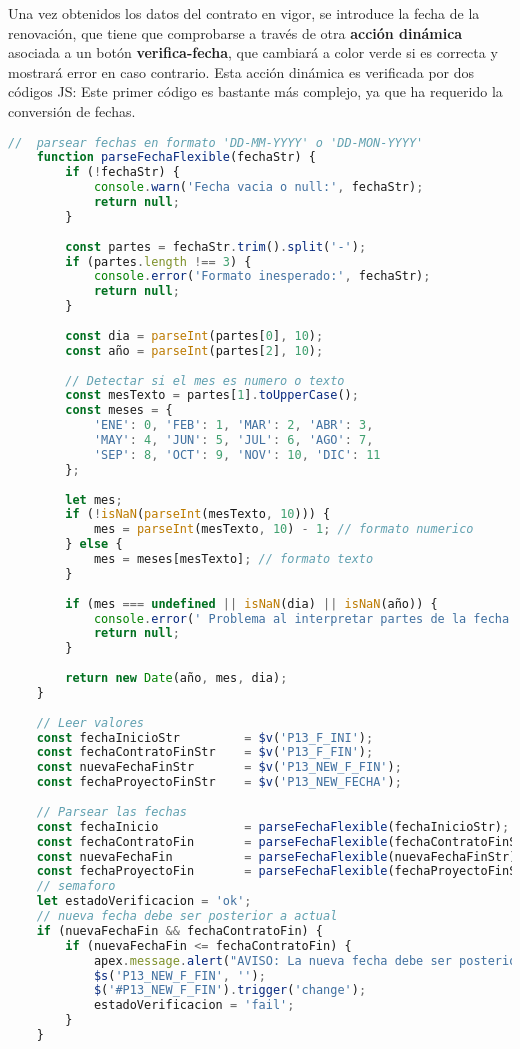 Una vez obtenidos los datos del contrato en vigor, se introduce la fecha de la renovación, que tiene que comprobarse a través de otra \textbf{acción dinámica} asociada a un botón \textbf{verifica-fecha}, que cambiará a color verde si es correcta y mostrará error en caso contrario. Esta acción dinámica es verificada por dos códigos \acrshort{JS}:
Este primer código es bastante más complejo, ya que ha requerido la conversión de fechas.
\begin{lstlisting}[language=JavaScript, caption={Verifica la fecha de renovación se posterior a la actual y anterior a fin proyecto}]
	//  parsear fechas en formato 'DD-MM-YYYY' o 'DD-MON-YYYY'
	function parseFechaFlexible(fechaStr) {
		if (!fechaStr) {
			console.warn('Fecha vacia o null:', fechaStr);
			return null;
		}
		
		const partes = fechaStr.trim().split('-');
		if (partes.length !== 3) {
			console.error('Formato inesperado:', fechaStr);
			return null;
		}
		
		const dia = parseInt(partes[0], 10);
		const año = parseInt(partes[2], 10);
		
		// Detectar si el mes es numero o texto
		const mesTexto = partes[1].toUpperCase();
		const meses = {
			'ENE': 0, 'FEB': 1, 'MAR': 2, 'ABR': 3,
			'MAY': 4, 'JUN': 5, 'JUL': 6, 'AGO': 7,
			'SEP': 8, 'OCT': 9, 'NOV': 10, 'DIC': 11
		};
		
		let mes;
		if (!isNaN(parseInt(mesTexto, 10))) {
			mes = parseInt(mesTexto, 10) - 1; // formato numerico
		} else {
			mes = meses[mesTexto]; // formato texto
		}
		
		if (mes === undefined || isNaN(dia) || isNaN(año)) {
			console.error(' Problema al interpretar partes de la fecha:', partes);
			return null;
		}
		
		return new Date(año, mes, dia);
	}
	
	// Leer valores 
	const fechaInicioStr         = $v('P13_F_INI');
	const fechaContratoFinStr    = $v('P13_F_FIN');
	const nuevaFechaFinStr       = $v('P13_NEW_F_FIN');
	const fechaProyectoFinStr    = $v('P13_NEW_FECHA');
	
	// Parsear las fechas
	const fechaInicio            = parseFechaFlexible(fechaInicioStr);
	const fechaContratoFin       = parseFechaFlexible(fechaContratoFinStr);
	const nuevaFechaFin          = parseFechaFlexible(nuevaFechaFinStr);
	const fechaProyectoFin       = parseFechaFlexible(fechaProyectoFinStr);
	// semaforo
	let estadoVerificacion = 'ok';
	// nueva fecha debe ser posterior a actual
	if (nuevaFechaFin && fechaContratoFin) {
		if (nuevaFechaFin <= fechaContratoFin) {
			apex.message.alert("AVISO: La nueva fecha debe ser posterior a la actual");
			$s('P13_NEW_F_FIN', '');
			$('#P13_NEW_F_FIN').trigger('change');
			estadoVerificacion = 'fail';
		}
	}
	

\end{lstlisting}
